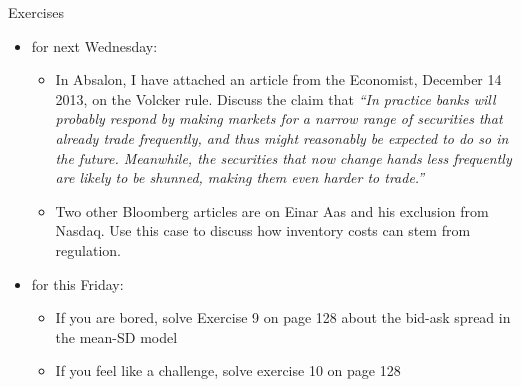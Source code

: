 \documentclass[english,10pt]{beamer}
\begin{document}
\begin{frame}{Exercises}
	\begin{itemize}
		\item for next Wednesday:
		\begin{itemize}
			\item In Absalon, I have attached an article from the Economist, December 14 2013, on the Volcker rule. Discuss the claim that \emph{``In practice banks will probably respond by making markets for a narrow range of securities that already trade frequently, and thus might reasonably be expected to do so in the future. Meanwhile, the securities that now change hands less frequently are likely to be shunned, making them even harder to trade.''}
			\item Two other Bloomberg articles are on Einar Aas and his exclusion from Nasdaq. Use this case to discuss how inventory costs can stem from regulation.
		\end{itemize}
		\item for this Friday:
		\begin{itemize}
			\item If you are bored, solve Exercise 9 on page 128 about the bid-ask spread in the mean-SD model
			\item If you feel like a challenge, solve exercise 10 on page 128
		\end{itemize}
	\end{itemize}
\end{frame}
\end{document}
